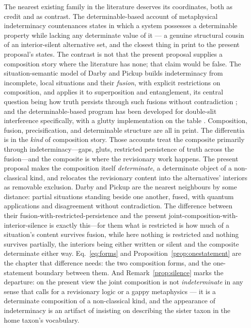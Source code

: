 \documentclass[11pt]{article}
\begin{document}
The nearest existing family in the literature deserves its coordinates, both as credit and as contrast. The determinable-based account of metaphysical indeterminacy \parencite{darby2010, skow2010, wilson2013, calosi2019} countenances states in which a system possesses a determinable property while lacking any determinate value of it --- a genuine structural cousin of an interior-silent alternative set, and the closest thing in print to the present proposal's states. The contrast is not that the present proposal supplies a composition story where the literature has none; that claim would be false. The situation-semantic model of Darby and Pickup builds indeterminacy from incomplete, local situations and their \emph{fusion}, with explicit restrictions on composition, and applies it to superposition and entanglement, its central question being how truth persists through such fusions without contradiction \parencite{darbypickup2021}; and the determinable-based program has been developed for double-slit interference specifically, with a glutty implementation on the table \parencite{calosiwilson2021}. Composition, fusion, precisification, and determinable structure are all in print. The differentia is in the \emph{kind} of composition story. Those accounts treat the composite primarily through indeterminacy---gaps, gluts, restricted persistence of truth across the fusion---and the composite is where the revisionary work happens. The present proposal makes the composition itself \emph{determinate}, a determinate object of a non-classical kind, and relocates the revisionary content into the alternatives' interiors as removable exclusion. Darby and Pickup are the nearest neighbours by some distance: partial situations standing beside one another, fused, with quantum applications and disagreement without contradiction. The difference between their fusion-with-restricted-persistence and the present joint-composition-with-interior-silence is exactly this---for them what is restricted is how much of a situation's content survives fusion, while here nothing is restricted and nothing survives partially, the interiors being either written or silent and the composite determinate either way. Eq.~\eqref{eq:forms} and Proposition~\ref{prop:onestatement} are the chapter that difference needs: the two composition forms, and the one-statement boundary between them. And Remark~\ref{prop:silence} marks the departure: on the present view the joint composition is not \emph{indeterminate} in any sense that calls for a revisionary logic or a gappy metaphysics \parencite{barneswilliams2011} --- it is a determinate composition of a non-classical kind, and the appearance of indeterminacy is an artifact of insisting on describing the sister taxon in the home taxon's vocabulary.
\end{document}
